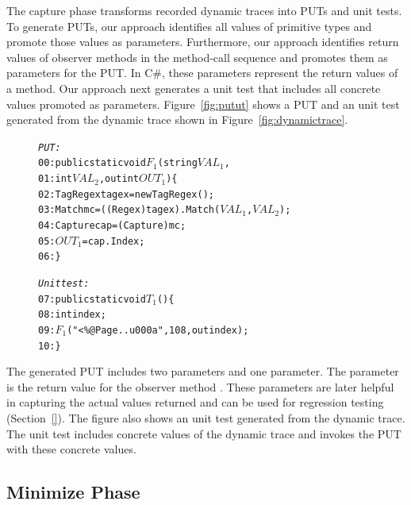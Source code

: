 The capture phase transforms recorded dynamic traces into PUTs and unit
tests. To generate PUTs, our approach identifies all values of primitive
types and promote those values as parameters. Furthermore, our approach identifies
return values of observer methods in the method-call sequence and
promotes them as  parameters for the PUT. In C\#, these
 parameters represent the return values of a method.
Our approach next generates a unit test that includes all concrete values
promoted as parameters. Figure~\ref{fig:putut} shows a PUT and an unit test
generated from the dynamic trace shown in Figure~\ref{fig:dynamictrace}.

\begin{figure}[t]
\begin{CodeOut}
\begin{alltt}

\emph{PUT:}
00: public static void $F_1$(string $VAL_1$, 
01: \hspace*{0.3in}int $VAL_2$, out int $OUT_1$) \{
02:    TagRegex tagex = new TagRegex();
03:    Match mc = ((Regex)tagex).Match($VAL_1$, $VAL_2$);
04:    Capture cap = (Capture) mc;
05:    $OUT_1$ = cap.Index;
06: \}

\emph{Unit test:}
07: public static void $T_1$() \{
08:      int index;
09:      $F_1$("<\%@ Page..u000a", 108, out index);     
10: \}

\end{alltt}
\end{CodeOut}\vspace*{-3ex}
\vspace*{-3ex}
\end{figure}

The generated PUT includes two parameters and one  parameter.
The  parameter is the return value for the observer
method . These  parameters are later
helpful in capturing the actual values returned and can be used
for regression testing (Section~\ref{}). The figure also shows an unit
test generated from the dynamic trace. The unit test includes concrete
values of the dynamic trace and invokes the PUT with these concrete values.

\subsection{Minimize Phase}
\label{sec:minimize}

